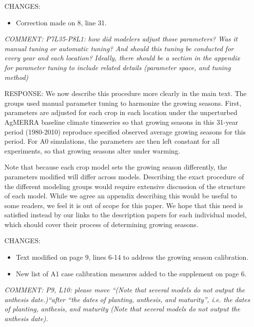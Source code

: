 \documentclass[gmd, manuscript]{copernicus} %
\begin{document}
CHANGES:
\begin{itemize}
    \item Correction made on 8, line 31.
\end{itemize}

\smallskip

\textcolor{dark-gray}{\textit{COMMENT: P7L35-P8L1: how did modelers adjust those parameters? Was it manual tuning or automatic tuning? And should this tuning be conducted for every year and each location? Ideally, there should be a section in the appendix for parameter tuning to include related details (parameter space, and tuning method)}}

RESPONSE: We now describe this procedure more clearly in the main text. The groups used manual parameter tuning to harmonize the growing seasons. First, parameters are adjusted for each crop in each location under the unperturbed AgMERRA baseline climate timeseries so that growing seasons in this 31-year period (1980-2010) reproduce specified observed average growing seasons for this period. For A0 simulations, the parameters are then left constant for all experiments, so that growing seasons alter under warming. 

Note that because each crop model sets the growing season differently, the parameters modified will differ across models. Describing the exact procedure of the different modeling groups would require extensive discussion of the structure of each model. While we agree an appendix describing this would be useful to some readers, we feel it is out of scope for this paper. We hope that this need is satisfied instead by our links to the description papers for each individual model, which should cover their process of determining growing seasons.
\smallskip

CHANGES:
\begin{itemize}
    \item Text modified on page 9, lines 6-14 to address the growing season calibration.
    \item New list of A1 case calibration measures added to the supplement on page 6.
\end{itemize}

\smallskip

\textcolor{dark-gray}{\textit{COMMENT: P9, L10: please move “(Note that several models do not output the anthesis date.)“after “the dates of planting, anthesis, and maturity”, i.e. the dates of planting, anthesis, and maturity (Note that several models do not output the anthesis date).}}
\end{document}
